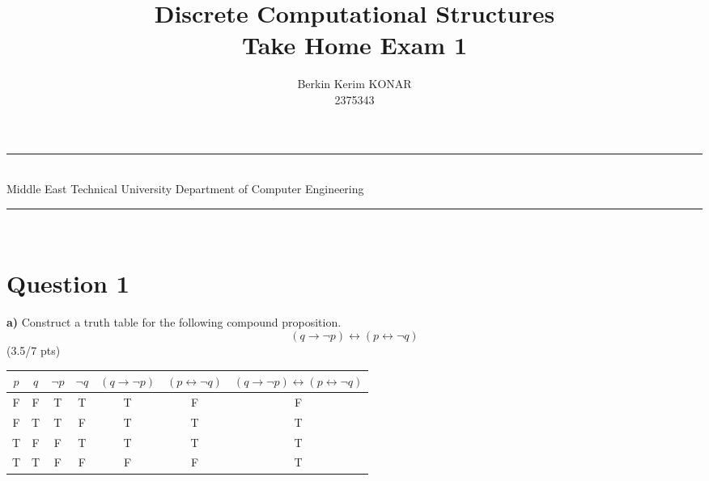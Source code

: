 \documentclass[a4paper,12pt]{article}
\title{Discrete Computational Structures \\ Take Home Exam 1}
\author{Berkin Kerim KONAR \\ 2375343} %
\date{} %
\newcommand{\HRule}{\rule{\linewidth}{1mm}}
\newcommand\tab[1][1cm]{\hspace*{#1}}
\begin{document}
\HRule\\
Middle East Technical University \hfill Department of Computer Engineering
{\let\newpage\relax\maketitle}
\HRule\\
\vspace{1cm}


\section*{Question 1 \hfill {}}

\tab \textbf{a)} Construct a truth table for the following compound proposition.
\begin{equation*}
    (q \rightarrow \neg p)\leftrightarrow (p \leftrightarrow \neg q)
\end{equation*} 
\hfill \small{(3.5/7 pts)} \\
\begin{tcolorbox}
\begin{center}
    \begin{tabular}{|c|c|c|c|c|c|c|}
    \hline
    $p$ & $q$ & $\neg p$ & $\neg q$ & $(q\rightarrow \neg p)$ & $(p \leftrightarrow \neg q)$ & $(q\rightarrow \neg p) \leftrightarrow (p \leftrightarrow \neg q)$ \\
    \hline \hline
    F & F & T & T & T & F & F \\
    \hline
    F & T & T & F & T & T & T \\
    \hline
    T & F & F & T & T & T & T \\
    \hline
    T & T & F & F & F & F & T \\
    \hline
    \end{tabular}
\end{center}
\end{tcolorbox}\\\\\\\\\\\\\\\\\\\\\\\\\\
\end{document}
